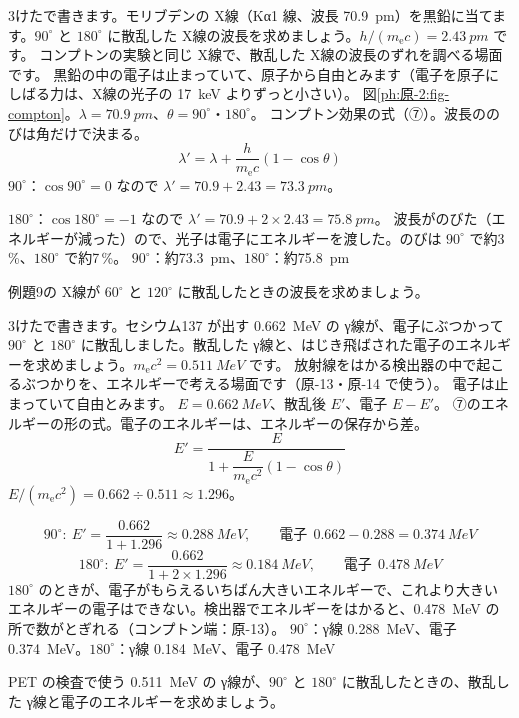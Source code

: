 \label{ph:原-2:ex9}
\begin{phreidai}[X線のコンプトン散乱]
3けたで書きます。モリブデンの X線（Kα1 線、波長 \qty{70.9}{pm}）を黒鉛に当てます。$90^\circ$ と $180^\circ$ に散乱した X線の波長を求めましょう。$h/(m_{\mathrm e}c)=\qty{2.43}{pm}$ です。
\phbamen
コンプトンの実験と同じ X線で、散乱した X線の波長のずれを調べる場面です。
\phmushi
黒鉛の中の電子は止まっていて、原子から自由とみます（電子を原子にしばる力は、X線の光子の \qty{17}{keV} よりずっと小さい）。
\phzu
図\ref{ph:原-2:fig-compton}。$\lambda=\qty{70.9}{pm}$、$\theta=90^\circ$・$180^\circ$。
\phriyu
コンプトン効果の式（⑦）。波長ののびは角だけで決まる。
\phtateru
\[ \lambda'=\lambda+\frac{h}{m_{\mathrm e}c}(1-\cos\theta) \]
\phtoku
$90^\circ$：$\cos90^\circ=0$ なので $\lambda'=70.9+2.43=\qty{73.3}{pm}$。\par
$180^\circ$：$\cos180^\circ=-1$ なので $\lambda'=70.9+2\times2.43=\qty{75.8}{pm}$。
\phtashikame
波長がのびた（エネルギーが減った）ので、光子は電子にエネルギーを渡した。のびは $90^\circ$ で約3\,\%、$180^\circ$ で約7\,\%。
\kotae $90^\circ$：約\qty{73.3}{pm}、$180^\circ$：約\qty{75.8}{pm}
\end{phreidai}
\begin{jibun}
例題9の X線が $60^\circ$ と $120^\circ$ に散乱したときの波長を求めましょう。
\end{jibun}

\label{ph:原-2:ex10}
\begin{phreidai}[γ線のコンプトン散乱とエネルギー]
3けたで書きます。セシウム137 が出す \qty{0.662}{MeV} の γ線が、電子にぶつかって $90^\circ$ と $180^\circ$ に散乱しました。散乱した γ線と、はじき飛ばされた電子のエネルギーを求めましょう。$m_{\mathrm e}c^2=\qty{0.511}{MeV}$ です。
\phbamen
放射線をはかる検出器の中で起こるぶつかりを、エネルギーで考える場面です（原-13・原-14 で使う）。
\phmushi
電子は止まっていて自由とみます。
\phzu
$E=\qty{0.662}{MeV}$、散乱後 $E'$、電子 $E-E'$。
\phriyu
⑦のエネルギーの形の式。電子のエネルギーは、エネルギーの保存から差。
\phtateru
\[ E'=\frac{E}{1+\dfrac{E}{m_{\mathrm e}c^2}(1-\cos\theta)} \]
\phtoku
$E/(m_{\mathrm e}c^2)=0.662\div0.511\approx1.296$。\par
\[ 90^\circ:\ E'=\frac{0.662}{1+1.296}\approx\qty{0.288}{MeV},\qquad\text{電子}\ \ 0.662-0.288=\qty{0.374}{MeV} \]
\[ 180^\circ:\ E'=\frac{0.662}{1+2\times1.296}\approx\qty{0.184}{MeV},\qquad\text{電子}\ \ \qty{0.478}{MeV} \]
\phtashikame
$180^\circ$ のときが、電子がもらえるいちばん大きいエネルギーで、これより大きいエネルギーの電子はできない。検出器でエネルギーをはかると、\qty{0.478}{MeV} の所で数がとぎれる（コンプトン端：原-13）。
\kotae $90^\circ$：γ線 \qty{0.288}{MeV}、電子 \qty{0.374}{MeV}。$180^\circ$：γ線 \qty{0.184}{MeV}、電子 \qty{0.478}{MeV}
\end{phreidai}
\begin{jibun}
PET の検査で使う \qty{0.511}{MeV} の γ線が、$90^\circ$ と $180^\circ$ に散乱したときの、散乱した γ線と電子のエネルギーを求めましょう。
\end{jibun}

